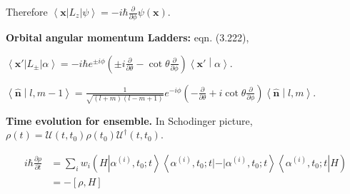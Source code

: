   Therefore
$\left\langle \mathbf{x} \right| L_z \left| \psi \right\rangle
  = - i \hbar \frac{\partial }{\partial \phi} \psi(\mathbf{x})
  .$ 

\textbf{Orbital angular momentum Ladders:} eqn. (3.222), 

$\left\langle \mathbf{x}' \right| L_{\pm} \left| \alpha \right\rangle
  = - i \hbar e^{ \pm i \phi} \left(  \pm  i \frac{\partial }{\partial \theta} - \cot \theta \frac{\partial }{\partial \phi}  \right)
  \left\langle \mathbf{x}' \middle| \alpha \right\rangle
  .$ 

$\left\langle \hat{\mathbf{n}}  \middle| l, m - 1\right\rangle
= \frac{1}{\sqrt{(l + m) (l - m + 1)} } e^{- i \phi} \left( - \frac{\partial }{\partial \theta} + i \cot \theta \frac{\partial }{\partial \phi}  \right) \left\langle \hat{\mathbf{n}}  \middle| l,m \right\rangle
.$

\textbf{Time evolution for ensemble.} In Schodinger picture, $\rho(t)=\mathscr{U}\left(t, t_0\right) \rho\left(t_0\right) \mathscr{U}^{\dagger}\left(t, t_0\right)$. 

$$
\begin{aligned}
i \hbar \frac{\partial \rho}{\partial t} & =\sum_i w_i\left(H\left|\alpha^{(i)}, t_0 ; t\right\rangle\left\langle\alpha^{(i)}, t_0 ; t|-| \alpha^{(i)}, t_0 ; t\right\rangle\left\langle\alpha^{(i)}, t_0 ; t\right| H\right) \\
& =-[\rho, H]
\end{aligned}
$$
